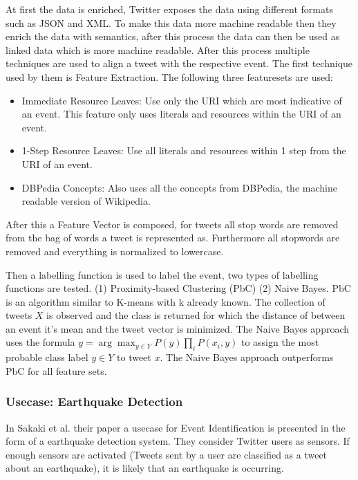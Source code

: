 \documentclass{article}
\begin{document}
At first the data is enriched, Twitter exposes the data using different formats such as JSON and XML. To make this data more machine readable then they enrich the data with semantics, after this process the data can then  be used as linked data which is more machine readable. After this process multiple techniques are used to align a tweet with the respective event. The first technique used by them is Feature Extraction. \cite{eventalign} The following three featuresets are used:
\begin{itemize}

  \item Immediate Resource Leaves: Use only the URI which are most indicative of an event. This feature only uses literals and resources within the URI of an event. 
  \item 1-Step Resource Leaves: Use all literals and resources within 1 step from the URI of an event. 
  \item DBPedia Concepts: Also uses all the concepts from DBPedia, the machine readable version of Wikipedia.
\end{itemize}
After this a Feature Vector is composed, for tweets all stop words are removed from the bag of words a tweet is represented as. Furthermore all stopwords are removed and everything is normalized to lowercase. \cite{eventalign} 

Then a labelling function is used to label the event, two types of labelling functions are tested. (1) Proximity-based Clustering (PbC) (2) Naive Bayes. PbC is an algorithm similar to K-means with k already known. The collection of tweets $X$ is observed and the class is returned for which the distance of between an event it's mean and the tweet vector is minimized. The Naive Bayes approach uses the formula $y = \arg\max_{y \in Y} P(y)\prod_i P(x_i, y)$ to assign the most probable class label $y \in Y$ to tweet $x$. The Naive Bayes approach outperforms PbC for all feature sets.  \cite{eventalign}
\subsubsection*{Usecase: Earthquake Detection}


In Sakaki et al. their paper a usecase for Event Identification is presented in the form of a earthquake detection system. \cite{earthq} They consider Twitter users as sensors. If enough sensors are activated (Tweets sent by a user are classified as a tweet about an earthquake), it is likely that an earthquake is occurring. 
\end{document}
